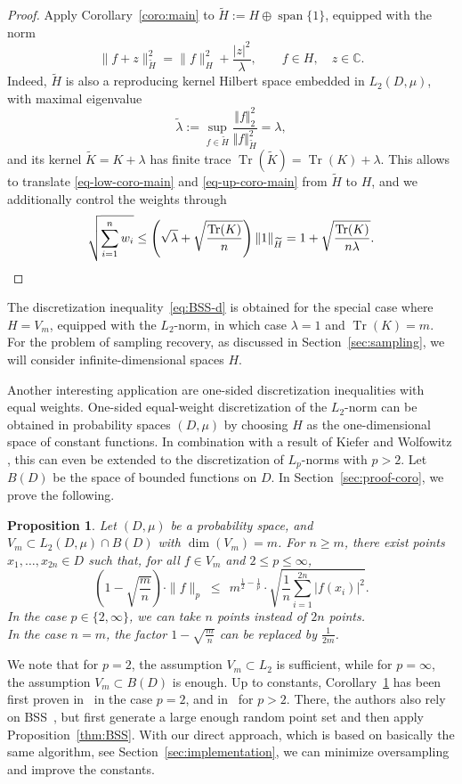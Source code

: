 \documentclass[a4paper,11pt]{article}
\renewcommand{\(}{\left (}
\renewcommand{\)}{\right )}
\newcommand{\<}{\langle}
\renewcommand{\>}{\rangle}
\newcommand{\C}{\mathbb{C}}
\newtheorem{prop}[theorem]{Proposition}
\theoremstyle{definition}
\DeclareMathOperator{\Span}{span}
\DeclareMathOperator{\Tr}{Tr}
\begin{document}
\begin{proof}
Apply Corollary~\ref{coro:main} to $\widetilde H:=H\oplus \Span\{1\}$, equipped with the norm
\[
\|f+z\|_{\widetilde H}^2=\|f\|_{H}^2+\frac{|z|^2}\lambda,\qquad f\in H,\quad z\in \C.
\]
Indeed, $\widetilde H$ is also a reproducing kernel Hilbert space embedded in $L_2(D,\mu)$, with maximal eigenvalue
\[
\tilde \lambda:=\sup_{f \in \widetilde H} \frac{\Vert f \Vert_2^2}{\Vert f \Vert_{\widetilde H}^2} =\lambda,
\]
and its kernel $\widetilde K=K+\lambda$ has finite trace
$\Tr(\widetilde K)= \Tr(K)+ \lambda$.
This allows to translate \eqref{eq-low-coro-main} and \eqref{eq-up-coro-main} from $\widetilde H$ to $H$, and we additionally control the weights through
\[
\sqrt{\sum_{i=1}^n w_i}\leq \left(\sqrt{\lambda} +\sqrt{\frac{\Tr(K)}{n}} \right)\|1\|_{\widetilde H}=1+\sqrt{\frac{\Tr(K)}{n\lambda}}.\qedhere
\]
\end{proof}


The discretization inequality~\eqref{eq:BSS-d} is obtained for the special case where $H=V_m$, equipped with the $L_2$-norm, in which case 
$\lambda=1$ and $\Tr(K)=m$.
For the problem of sampling recovery,
as discussed in Section~\ref{sec:sampling},
we will consider infinite-dimensional spaces $H$.

Another interesting application are one-sided
discretization inequalities with equal weights. 
One-sided equal-weight discretization of the $L_2$-norm can be obtained in probability spaces $(D,\mu)$ by choosing $H$ as the one-dimen\-sional space of constant functions.
In combination with a result of Kiefer and Wolfowitz \cite{KW},
this can even be extended to the discretization of $L_p$-norms with $p>2$. 
Let $B(D)$ be the space of bounded functions on $D$.
In Section~\ref{sec:proof-coro}, we prove the following.

\begin{prop}
\label{coro:intro-equal}
Let $(D,\mu)$ be a probability space, and 
$V_m\subset L_2(D,\mu)\cap B(D)$ with $\dim(V_m)=m$. 
For $n\geq m$, there exist points $x_1,\hdots,x_{2n}\in D$ such that,
for all $f\in V_m$ and $2\leq p\leq\infty$, 
\[
\left(1-\sqrt{\frac{m}{n}}\right)
\cdot \|f\|_p 
\;\leq\; 
\,m^{\frac12-\frac1p}\cdot
\sqrt{\frac{1}{n}\sum_{i=1}^{2n} |f(x_i)|^2}.
\]
In the case $p\in\{2,\infty\}$, we can take $n$ points instead of $2n$ points.\\
In the case $n=m$, the factor $1-\sqrt{\frac{m}{n}}$ can be replaced by $\frac{1}{2m}$.
\end{prop}

We note that for $p=2$, the assumption $V_m\subset L_2$ is sufficient,
while for $p=\infty$, the assumption $V_m \subset B(D)$ is enough.
Up to constants, Corollary~\ref{coro:intro-equal} has been first proven in~\cite{BSU} in the case $p=2$, and in~\cite{KPUU25-uniform} for $p> 2$. 
There, the authors also rely on BSS~\cite{BSS}, 
but first generate a large enough random point set and then apply Proposition~\ref{thm:BSS}. 
With our direct approach, 
which is based on basically the same algorithm,
see Section~\ref{sec:implementation}, 
we can minimize oversampling and improve the constants.
\end{document}
